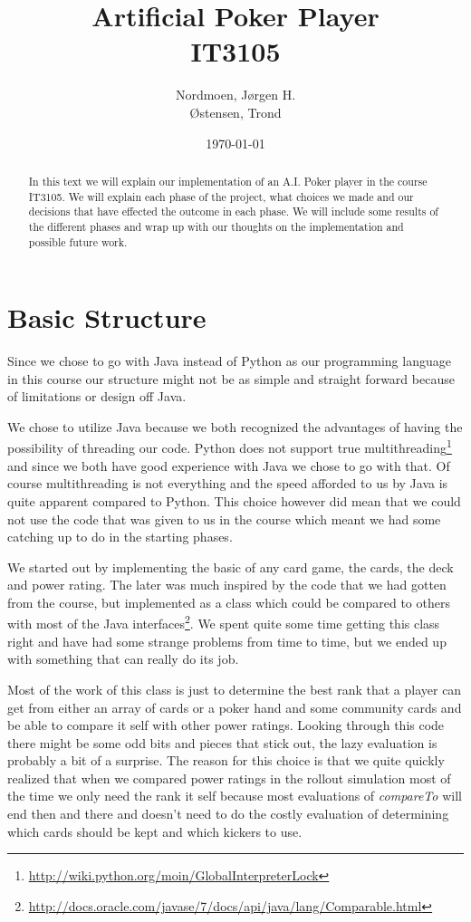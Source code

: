\documentclass[titlepage, a4paper]{article}
\title{
	Artificial Poker Player \\
	IT3105 \\
}
\author{
	Nordmoen, Jørgen H. \\
	Østensen, Trond
}
\date{\today}
\begin{document}
\maketitle

\begin{abstract}\label{abstract}
In this text we will explain our implementation of an A.I. Poker player in the course
IT3105. We will explain each phase of the project, what choices we made and our decisions
that have effected the outcome in each phase. We will include some results of the different
phases and wrap up with our thoughts on the implementation and possible future work.
\end{abstract}

\newpage
\tableofcontents


\section{Basic Structure}\label{basic}
Since we chose to go with Java instead of Python as our programming language in this course
our structure might not be as simple and straight forward because of limitations or design
off Java.

We chose to utilize Java because we both recognized the advantages of having the possibility
of threading our code. Python does not support true multithreading\footnote{\url{http://wiki.python.org/moin/GlobalInterpreterLock}} and since we both have good experience with Java we chose to go with that.
Of course multithreading is not everything and the speed afforded to us by Java is quite
apparent compared to Python. This choice however did mean that we could not use the code that
was given to us in the course which meant we had some catching up to do in the starting phases.

We started out by implementing the basic of any card game, the cards, the deck and power rating.
The later was much inspired by the code that we had gotten from the course, but implemented as
a class which could be compared to others with most of the Java interfaces\footnote{\url{http://docs.oracle.com/javase/7/docs/api/java/lang/Comparable.html}}. We spent quite
some time getting this class right and have had some strange problems from time to time, but
we ended up with something that can really do its job. 

Most of the work of this class is
just to determine the best rank that a player can get from either an array of cards or
a poker hand and some community cards and be able to compare it self with other power ratings.
Looking through this code there might be some odd bits and pieces that stick out, the
lazy evaluation is probably a bit of a surprise. The reason for this choice is that we quite
quickly realized that when we compared power ratings in the rollout simulation most of the
time we only need the rank it self because most evaluations of \textit{compareTo} will end then and
there and doesn't need to do the costly evaluation of determining which cards should be
kept and which kickers to use.
\end{document}
